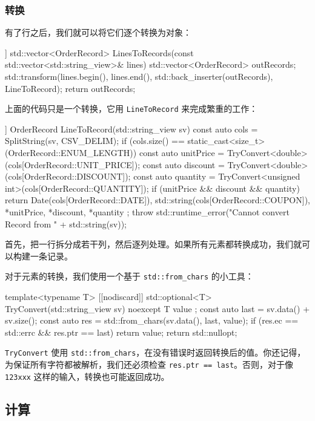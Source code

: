 \subsubsection*{转换}

有了行之后，我们就可以将它们逐个转换为对象：

\begin{codebox}[cpp]
[[nodiscard]] std::vector<OrderRecord>
LinesToRecords(const std::vector<std::string_view>& lines)
{
std::vector<OrderRecord> outRecords;
std::transform(lines.begin(), lines.end(),
std::back_inserter(outRecords), LineToRecord);
return outRecords;
}
\end{codebox}

上面的代码只是一个转换，它用 \texttt{LineToRecord} 来完成繁重的工作：

\begin{codebox}[cpp]
[[nodiscard]] OrderRecord LineToRecord(std::string_view sv)
{
const auto cols = SplitString(sv, CSV_DELIM);
if (cols.size() == static_cast<size_t>(OrderRecord::ENUM_LENGTH))
{
const auto unitPrice = TryConvert<double>(cols[OrderRecord::UNIT_PRICE]);
const auto discount = TryConvert<double>(cols[OrderRecord::DISCOUNT]);
const auto quantity = TryConvert<unsigned int>(cols[OrderRecord::QUANTITY]);
if (unitPrice && discount && quantity)
{
return { Date(cols[OrderRecord::DATE]),
std::string(cols[OrderRecord::COUPON]),
*unitPrice,
*discount,
*quantity };
}
}
throw std::runtime_error("Cannot convert Record from " + std::string(sv));
}
\end{codebox}

首先，把一行拆分成若干列，然后逐列处理。如果所有元素都转换成功，我们就可以构建一条记录。

对于元素的转换，我们使用一个基于 \texttt{std::from\_chars} 的小工具：

\begin{codebox}[cpp]
template<typename T>
[[nodiscard]] std::optional<T> TryConvert(std::string_view sv) noexcept
{
T value{ };
const auto last = sv.data() + sv.size();
const auto res = std::from_chars(sv.data(), last, value);
if (res.ec == std::errc{} && res.ptr == last)
return value;
return std::nullopt;
}
\end{codebox}

\texttt{TryConvert} 使用 \texttt{std::from\_chars}，在没有错误时返回转换后的值。你还记得，为保证所有字符都被解析，我们还必须检查 \texttt{res.ptr == last}。否则，对于像 \texttt{123xxx} 这样的输入，转换也可能返回成功。

\subsection{计算}


